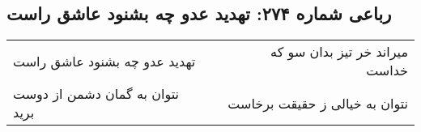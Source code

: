 \begin{center}
\section*{رباعی شماره ۲۷۴: تهدید عدو چه بشنود عاشق راست}
\label{sec:0274}
\begin{longtable}{l p{0.5cm} r}
تهدید عدو چه بشنود عاشق راست
&&
میراند خر تیز بدان سو که خداست
\\
نتوان به گمان دشمن از دوست برید
&&
نتوان به خیالی ز حقیقت برخاست
\\
\end{longtable}
\end{center}
